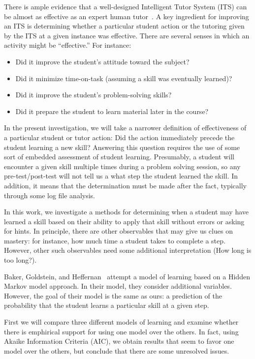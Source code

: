 \documentclass[prodmode,acmtecs]{acmsmall}
\begin{document}
There is ample evidence that a well-designed Intelligent Tutor 
System (ITS) can be almost as effective as an expert human 
tutor~\cite{its}.  A key ingredient for improving an ITS is
determining whether a particular student action or the 
tutoring given by the ITS at a given instance was effective.
There are several senses in which an activity might be ``effective.''
For instance:  
%
\begin{itemize}
\item Did it improve the student's attitude toward
the subject?  
\item Did it minimize time-on-task (assuming 
a skill was eventually learned)?  
\item Did it improve the student's 
problem-solving skills?  
\item Did it prepare the student to learn
material later in the course?
\end{itemize}

In the present investigation, we will take a narrower definition
of effectiveness of a particular student or tutor action:  
Did the action immediately precede the
student learning a new skill?  Answering this question requires
the use of some sort of embedded assessment of student learning.
Presumably, a student will encounter a given skill multiple times
during a problem solving session, so any pre-test/post-test will
not tell us a what step the student learned the skill.
In addition, it means that the determination must be made
after the fact, typically through some log file analysis. 

In this work, we investigate a methods for determining
when a student may have learned a skill based on their
ability to apply that skill without errors or asking for hints.
In principle, there are other observables that may give us
clues on mastery:  for instance, how much time a student takes
to complete a step.  However, other such observables need
some additional interpretation (How long is too long?).

Baker, Goldstein, and Heffernan~\cite{bgh} attempt a model
of learning based on a Hidden Markov model approach.  In their
model, they consider additional variables.  However, the
goal of their model is the same as ours:  a prediction 
of the probability that the student learns a particular
skill at a given step.

First we will compare three different models of learning
and examine whether there is emphirical support for using
one model over the others.  In fact, using Akaike Information
Criteria (AIC), we obtain results that seem to favor one 
model over the others, but conclude that there are some
unresolved issues.
\end{document}
